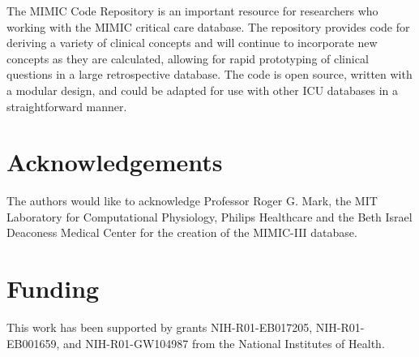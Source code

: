 \documentclass{bioinfo}
\begin{document}
The MIMIC Code Repository is an important resource for researchers who working with the MIMIC critical care database. The repository provides code for deriving a variety of clinical concepts and will continue to incorporate new concepts as they are calculated, allowing for rapid prototyping of clinical questions in a large retrospective database. The code is open source, written with a modular design, and could be adapted for use with other ICU databases in a straightforward manner.  \\

\section*{Acknowledgements}

The authors would like to acknowledge Professor Roger G. Mark, the MIT Laboratory for Computational Physiology, Philips Healthcare and the Beth Israel Deaconess Medical Center for the creation of the MIMIC-III database.%

\section*{Funding}

This work has been supported by grants NIH-R01-EB017205, NIH-R01-EB001659, and NIH-R01-GW104987 from the National Institutes of Health.%

%
%
%
%
%
%
%
%
%
\end{document}
